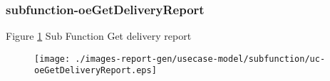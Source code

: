 \subsubsection{subfunction-oeGetDeliveryReport}

\label{RE-use-case-oeGetDeliveryReport}


Figure \ref{fig:lu.uni.lassy.excalibur.g01.specification-RE-UCD-uc-oeGetDeliveryReport}
Sub Function Get delivery report 

\begin{figure}[htbp]
\begin{center}

\texttt{[image: ./images-report-gen/usecase-model/subfunction/uc-oeGetDeliveryReport.eps]}
\end{center}
\caption[lu.uni.lassy.excalibur.g01.specification Use Case Diagram: uc-oeGetDeliveryReport]{}
\label{fig:lu.uni.lassy.excalibur.g01.specification-RE-UCD-uc-oeGetDeliveryReport}
\end{figure}
\vspace{0.5cm}
